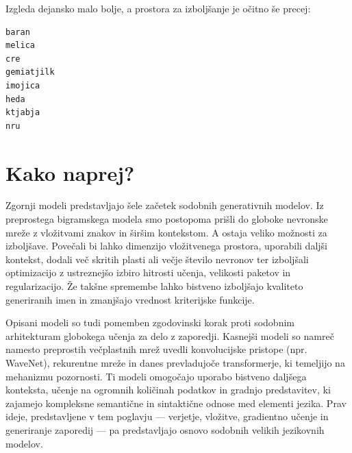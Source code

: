Izgleda dejansko malo bolje, a prostora za izboljšanje je očitno še precej:
\vspace*{3mm}
\begin{lstlisting}
baran
melica
cre
gemiatjilk
imojica
heda
ktjabja
nru
\end{lstlisting}

\section{Kako naprej?}

Zgornji modeli predstavljajo šele začetek sodobnih generativnih modelov. Iz preprostega bigramskega modela smo postopoma prišli do globoke nevronske mreže z vložitvami znakov in širšim kontekstom. A ostaja veliko možnosti za izboljšave. Povečali bi lahko dimenzijo vložitvenega prostora, uporabili daljši kontekst, dodali več skritih plasti ali večje število nevronov ter izboljšali optimizacijo z ustreznejšo izbiro hitrosti učenja, velikosti paketov in regularizacijo. Že takšne spremembe lahko bistveno izboljšajo kvaliteto generiranih imen in zmanjšajo vrednost kriterijske funkcije.

Opisani modeli so tudi pomemben zgodovinski korak proti sodobnim arhitekturam globokega učenja za delo z zaporedji. Kasnejši modeli so namreč namesto preprostih večplastnih mrež uvedli konvolucijske pristope (npr. WaveNet), rekurentne mreže in danes prevladujoče transformerje, ki temeljijo na mehanizmu pozornosti. Ti modeli omogočajo uporabo bistveno daljšega konteksta, učenje na ogromnih količinah podatkov in gradnjo predstavitev, ki zajamejo kompleksne semantične in sintaktične odnose med elementi jezika. Prav ideje, predstavljene v tem poglavju --- verjetje, vložitve, gradientno učenje in generiranje zaporedij --- pa predstavljajo osnovo sodobnih velikih jezikovnih modelov.